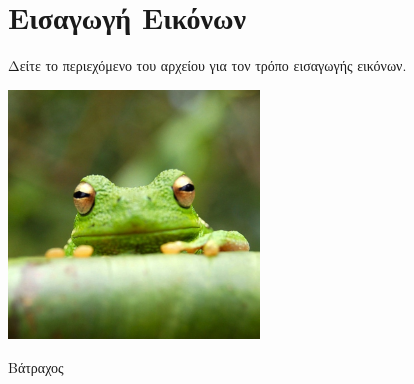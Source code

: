 \chapter{Εισαγωγή Εικόνων}
Δείτε το περιεχόμενο του αρχείου  για τον τρόπο εισαγωγής εικόνων.

\begin{Illustration}[!h] 
	\centering
	\includegraphics[width=0.5\textwidth]{figures/frog.jpg} 
	\caption{Βάτραχος}
	\label{frog_image}
\end{Illustration}
